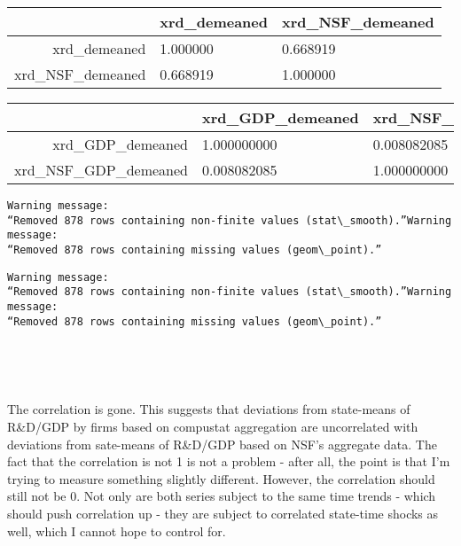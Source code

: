 \documentclass[11pt]{article}
\begin{document}
    \begin{tabular}{r|ll}
  & xrd\_demeaned & xrd\_NSF\_demeaned\\
\hline
	xrd\_demeaned & 1.000000 & 0.668919\\
	xrd\_NSF\_demeaned & 0.668919 & 1.000000\\
\end{tabular}


    
    \begin{tabular}{r|ll}
  & xrd\_GDP\_demeaned & xrd\_NSF\_GDP\_demeaned\\
\hline
	xrd\_GDP\_demeaned & 1.000000000 & 0.008082085\\
	xrd\_NSF\_GDP\_demeaned & 0.008082085 & 1.000000000\\
\end{tabular}


    
    \begin{Verbatim}[commandchars=\\\{\}]
Warning message:
“Removed 878 rows containing non-finite values (stat\_smooth).”Warning message:
“Removed 878 rows containing missing values (geom\_point).”
    \end{Verbatim}

    
    
    \begin{Verbatim}[commandchars=\\\{\}]
Warning message:
“Removed 878 rows containing non-finite values (stat\_smooth).”Warning message:
“Removed 878 rows containing missing values (geom\_point).”
    \end{Verbatim}

    
    
    \begin{center}
    \end{center}
    { \hspace*{\fill} \\}
    
    \begin{center}
    \end{center}
    { \hspace*{\fill} \\}
    
    The correlation is gone. This suggests that deviations from state-means
of R\&D/GDP by firms based on compustat aggregation are uncorrelated
with deviations from sate-means of R\&D/GDP based on NSF's aggregate
data. The fact that the correlation is not 1 is not a problem - after
all, the point is that I'm trying to measure something slightly
different. However, the correlation should still not be 0. Not only are
both series subject to the same time trends - which should push
correlation up - they are subject to correlated state-time shocks as
well, which I cannot hope to control for.
\end{document}
